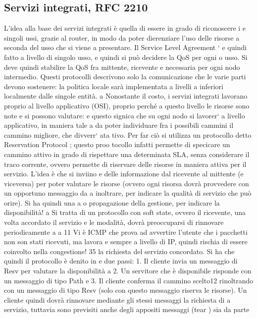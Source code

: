 \documentclass[a4paper,12pt]{article}
\begin{document}
\subsection{Servizi integrati, RFC 2210}
L'idea alla base dei servizi integrati è quella di essere in grado di riconoscere i
e
singoli ussi, grazie al router, in modo da poter dierenziare l'uso delle risorse
a seconda del usso che si viene a presentare. Il Service Level Agreement `
e
quindi fatto a livello di singolo usso, e quindi si può decidere la QoS per ogni
o
usso. Si deve quindi stabilire la QoS fra mittente, ricevente e necessaria per
ogni nodo intermedio. Questi protocolli descrivono solo la comunicazione che
le varie parti devono sostenere: la politica locale sarà implementata a livelli
a
inferiori localmente dalle singole entità.
a
Nonostante il costo, i servizi integrati lavorano proprio al livello applicativo
(OSI), proprio perché a questo livello le risorse sono note e si possono valutare:
e
questo signica che su ogni nodo si lavorer` a livello applicativo, in maniera tale
a
da poter individuare fra i possibili cammini il cammino migliore, che divverr` ata
tivo. Per far ciò si utilizza un protocollo detto Reservation Protocol ; questo proo
tocollo infatti permette di specicare un cammino attivo in grado di rispettare
una determinata SLA, senza considerare il traco corrente, ovvero permette di
riservare delle risorse in maniera attiva per il servizio. L'idea è che si inviino
e
delle informazione dal ricevente al mittente (e viceversa) per poter valutare le
risorse (ovvero ogni risorsa dovrà provvedere con un opportuno messaggio da
a
inoltrare, per indicare la qualità di servizio che può orire). Si ha quindi una
a
o
propagazione della gestione, per indicare la disponibilità!
a
Si tratta di un protocollo con soft state, ovvero il ricevente, una volta accordato il servizio e le modalità, dovrà
preoccuparsi di rinnovare periodicamente
a
a
11 Vi è ICMP che prova ad avvertire l'utente che i pacchetti non son stati ricevuti, ma lavora
e
sempre a livello di IP, quindi rischia di essere coinvolto nella congestione!
35
la richiesta del servizio concordato. Si ha che quindi il protocollo è denito in
e
due passi:
1. Il cliente invia un messaggio di Resv per valutare la disponibilità
a
2. Un servitore che è disponibile risponde con un messaggio di tipo Path
e
3. Il cliente conferma il cammino scelto12 rinoltrando con un messaggio di
tipo Resv (solo con questo messaggio riserva le risorse).
Un cliente quindi dovrà rinnovare mediante gli stessi messaggi la richiesta di
a
servizio, tuttavia sono previsiti anche degli appositi messaggi (tear ) sia da parte
\end{document}
